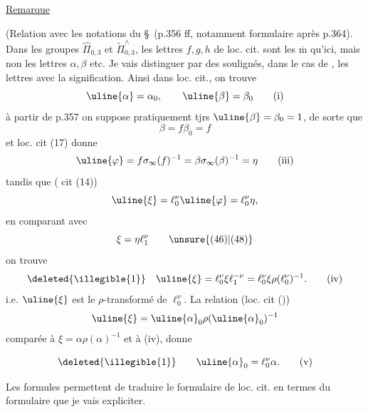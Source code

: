 \uline{Remarque}

(Relation avec les notations du \S\, (p.356 ff, notamment formulaire après p.364). Dans les groupes $\widehat{\Pi}_{0,3}$ et $\widetilde{\Pi}_{0,3}^{\wedge}$, les lettres $f,g,h$ de loc. cit. sont les $\overline{\mathrm m}$ qu'ici, mais non les lettres $\alpha,\beta$ etc. Je vais distinguer par des soulignés, dans le cas de  , les lettres avec la  signification. Ainsi dans loc. cit., on trouve
\[
\uline{\alpha}=\alpha_0,\qquad\uline{\beta}=\beta_0
\tag{i}
\]
à partir de p.357 on suppose pratiquement tjrs $\uline{\beta}=\beta_0=1$,  de sorte que
\[
\boxed{\beta=f\beta_0=f}
\tag{ii}
\]
 et loc. cit (17) donne
\[
\uline{\varphi}=f\sigma_\infty(f)^{-1}=\beta\sigma_\infty(\beta)^{-1}=\eta
\tag{iii}
\]
tandis que ( cit (14))
\[
\uline{\xi}=\ell_0^\nu\uline{\varphi}=\ell_0^\nu\eta,
\]
en comparant avec
\[
\xi=\eta\ell_1^\nu\qquad\unsure{(46)|(48)}
\]
on trouve
\[
\deleted{\illegible{1}}\quad\uline{\xi}=\ell_0^\nu\xi\ell_1^{-\nu}
=\ell_0^\nu\xi\rho(\ell_0^\nu)^{-1}.
\tag{iv}
\]
i.e. $\uline{\xi}$ est le $\rho$-transformé de $\ell_0^\nu$.
La relation (loc. cit ())
\[
\uline{\xi}=\uline{\alpha}_0\rho(\uline{\alpha}_0)^{-1}
\]
comparée à $\xi=\alpha\rho(\alpha)^{-1}$ et à (iv), donne


\[
\deleted{\illegible{1}}\qquad\uline{\alpha}_0=\ell_0^\nu\alpha.
\tag{v}
\]

Les formules   permettent de traduire le formulaire de loc. cit. en termes du formulaire que je vais expliciter.

